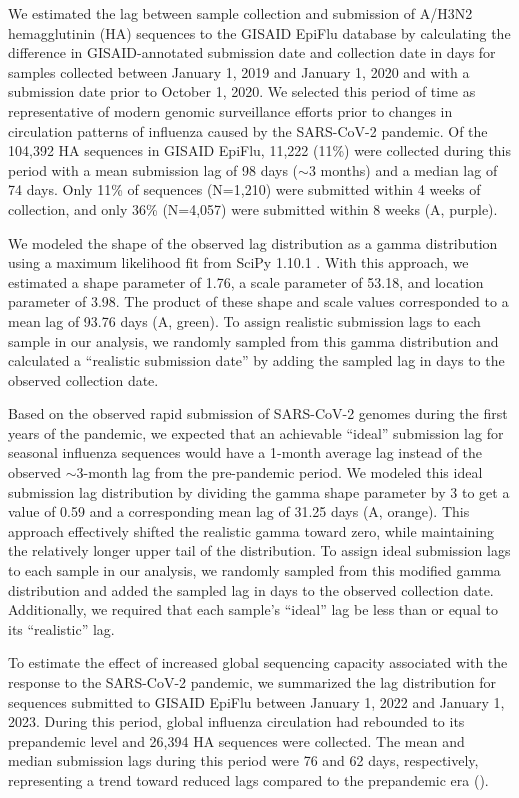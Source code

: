 \documentclass[9pt,lineno]{elife}
\begin{document}
We estimated the lag between sample collection and submission of A/H3N2 hemagglutinin (HA) sequences to the GISAID EpiFlu database \citep{gisaid} by calculating the difference in GISAID-annotated submission date and collection date in days for samples collected between January 1, 2019 and January 1, 2020 and with a submission date prior to October 1, 2020.
We selected this period of time as representative of modern genomic surveillance efforts prior to changes in circulation patterns of influenza caused by the SARS-CoV-2 pandemic.
Of the 104,392 HA sequences in GISAID EpiFlu, 11,222 (11\%) were collected during this period with a mean submission lag of 98 days ($\sim$3 months) and a median lag of 74 days.
Only 11\% of sequences (N=1,210) were submitted within 4 weeks of collection, and only 36\% (N=4,057) were submitted within 8 weeks (A, purple).

We modeled the shape of the observed lag distribution as a gamma distribution using a maximum likelihood fit from SciPy 1.10.1 \citep{scipy}.
With this approach, we estimated a shape parameter of 1.76, a scale parameter of 53.18, and location parameter of 3.98.
The product of these shape and scale values corresponded to a mean lag of 93.76 days (A, green).
To assign realistic submission lags to each sample in our analysis, we randomly sampled from this gamma distribution and calculated a ``realistic submission date'' by adding the sampled lag in days to the observed collection date.

Based on the observed rapid submission of SARS-CoV-2 genomes during the first years of the pandemic, we expected that an achievable ``ideal'' submission lag for seasonal influenza sequences would have a 1-month average lag instead of the observed $\sim$3-month lag from the pre-pandemic period.
We modeled this ideal submission lag distribution by dividing the gamma shape parameter by 3 to get a value of 0.59 and a corresponding mean lag of 31.25 days (A, orange).
This approach effectively shifted the realistic gamma toward zero, while maintaining the relatively longer upper tail of the distribution.
To assign ideal submission lags to each sample in our analysis, we randomly sampled from this modified gamma distribution and added the sampled lag in days to the observed collection date.
Additionally, we required that each sample's ``ideal'' lag be less than or equal to its ``realistic'' lag.

To estimate the effect of increased global sequencing capacity associated with the response to the SARS-CoV-2 pandemic, we summarized the lag distribution for sequences submitted to GISAID EpiFlu between January 1, 2022 and January 1, 2023.
During this period, global influenza circulation had rebounded to its prepandemic level and 26,394 HA sequences were collected.
The mean and median submission lags during this period were 76 and 62 days, respectively, representing a trend toward reduced lags compared to the prepandemic era ().
\end{document}
